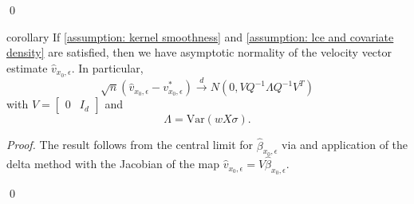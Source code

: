 \documentclass[11pt]{article}
\begin{document}
\qed{}

\begin{restatable}{corollary}{} \label{corr: central limit for v}
    If \cref{assumption: kernel smoothness} and \cref{assumption: lce and covariate density} are satisfied, then we have asymptotic normality of the velocity vector estimate $\hat{v}_{x_0, \epsilon}$. In particular,
    \[\sqrt{n}(\hat{v}_{x_0, \epsilon} - v^*_{x_0, \epsilon}) \overset{d}{\rightarrow}N(0, VQ^{-1}\Lambda Q^{-1}V^T)\]
    with $V = \begin{bmatrix}
        0 & I_d
    \end{bmatrix}$ and 
    \[\Lambda = \text{Var}(wX\sigma).\]
\end{restatable}
\noindent \textit{Proof.} The result follows from the central limit for $\hat{\beta}_{x_0, \epsilon}$ via  and application of the delta method with the Jacobian of the map $\hat{v}_{x_0, \epsilon} = V\hat{\beta}_{x_0, \epsilon}$. 

\qed{}
\end{document}

